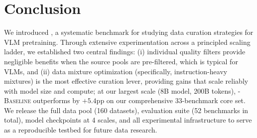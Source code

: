 \section{Conclusion}\label{sec:conclusion}

We introduced \dcvlm, a systematic benchmark for studying data curation strategies for VLM pretraining.
Through extensive experimentation across a principled scaling ladder, we established two central findings:
(i) individual quality filters provide negligible benefits when the source pools are pre-filtered, which is typical for VLMs, and
(ii) data mixture optimization (specifically, instruction-heavy mixtures) is the most effective curation lever, providing gains that scale reliably with model size and compute;
at our largest scale (8B model, 200B tokens), \textsc{\dcvlm-Baseline} outperforms \fv by $+5.4$pp on our comprehensive 33-benchmark core set.
We release the full data pool (160 datasets), evaluation suite (52 benchmarks in total), model checkpoints at 4 scales, and all experimental infrastructure
to serve as a reproducible testbed for future data research.
